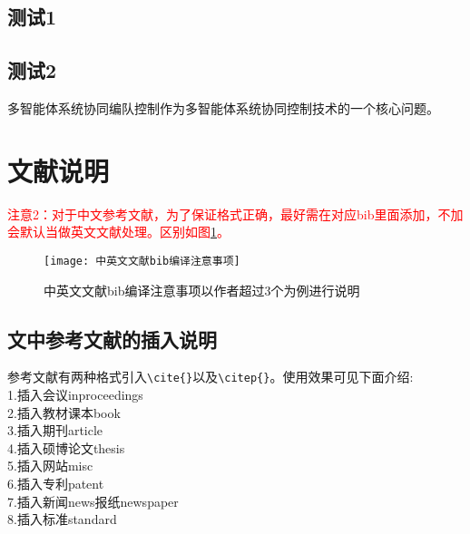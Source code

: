 \documentclass{wreport}
\begin{document}
\tableofcontents
\figurelist
\tablelist


\mytitle %
\myintroduction %


\subsection{测试1}
\subsection{测试2}
多智能体系统协同编队控制作为多智能体系统协同控制技术的一个核心问题。

\section{文献说明}

\textcolor{red}{注意2：对于中文参考文献，为了保证格式正确，最好需在对应bib里面添加，不加会默认当做英文文献处理。区别如图\ref{fig_bib0}。}

\begin{figure}[!htb]
  \centering
  \texttt{[image: 中英文文献bib编译注意事项]}
  \caption{中英文文献bib编译注意事项以作者超过3个为例进行说明}
  \label{fig_bib0}
\end{figure}


\subsection{文中参考文献的插入说明}
参考文献有两种格式引入\verb+\cite{}+以及\verb+\citep{}+。使用效果可见下面介绍:\\
1.插入会议inproceedings\cite{zhao2015bearing0}\\
2.插入教材课本book\cite{williams1991probability,chengzhaolin2006,zhangsan2007}\\
3.插入期刊article\cite{cao2011formation,xue2015formation}\\
4.插入硕博论文thesis\cite{lisi2015,wangwu2015,deans2005bearings}\\
5.插入网站misc\cite{irdawebsite,h7n9,wikipedia_moores_law}\\
6.插入专利patent\cite{xiao2012yi,p6915001}\\
7.插入新闻news报纸newspaper\cite{zhang2000,renminribao}\\
8.插入标准standard\cite{gbt3469-1983}
\end{document}
